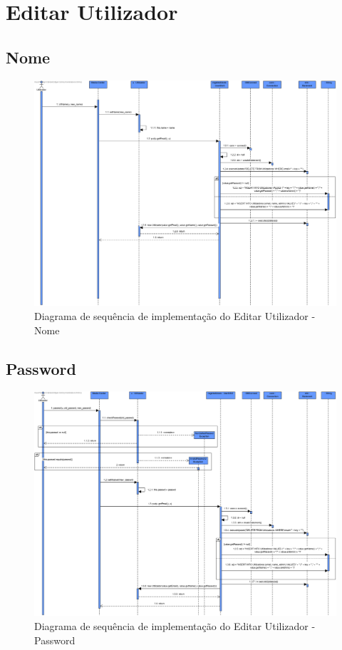 \documentclass[a4paper]{report}
\begin{document}
\section{Editar Utilizador}
\subsection{Nome}
\begin{figure}[H]
	\centering 
    \includegraphics[width=\textwidth]{images/editUserNameImp.png}  
    \caption{Diagrama de sequência de implementação do Editar Utilizador - Nome}
\end{figure}

\subsection{Password}
\begin{figure}[H]
	\centering 
    \includegraphics[width=\textwidth]{images/editUserPassImp.png}  
    \caption{Diagrama de sequência de implementação do Editar Utilizador - Password}
\end{figure}
\end{document}
